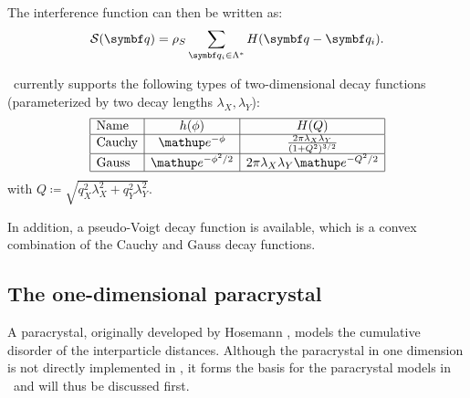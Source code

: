 The interference function can then be written as:
\begin{equation}
  \SD(\q) = \rho_S \sum_{\q_i\in\Lambda^*} H(\q - \q_i).
\end{equation}

\BornAgain\ currently supports the following types of two-dimensional decay functions
(parameterized by two decay lengths $\lambda_X, \lambda_Y$):
\begin{equation}
  \begin{array}{|l|c|c|}
    \hline
    \text{Name} & h(\phi) & H(Q) \\
    \hline
    \text{Cauchy} & \e^{-\phi} & \frac{2\pi\lambda_X\lambda_Y}{(1+Q^2)^{3/2}} \\
    \hline
    \text{Gauss} & \e^{-\phi^2/2} & 2\pi\lambda_X\lambda_Y \e^{-Q^2/2} \\
    \hline
  \end{array}
\end{equation}
with $Q \coloneqq \sqrt{q_X^2\lambda_X^2 + q_Y^2\lambda_Y^2}$.

In addition, a pseudo-Voigt decay function is available,
which is a convex combination of the Cauchy and Gauss decay functions.

\subsection{The one-dimensional paracrystal} \label{sec:sect:1dparacrystal}

A paracrystal, originally developed by Hosemann \cite{Hos51},
models the cumulative disorder of the interparticle distances.
Although the paracrystal in one dimension is not directly implemented in \BornAgain,
it forms the basis for the paracrystal models in \BornAgain\ and will thus be discussed first.

